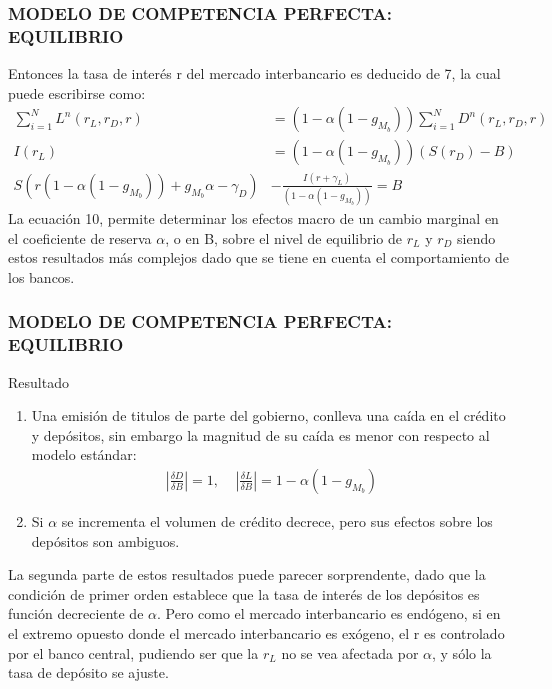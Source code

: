 \documentclass[10pt, xcolor=table, x11names]{beamer}
\begin{document}
\begin{frame}
    \frametitle{{\normalsize MODELO DE COMPETENCIA PERFECTA: EQUILIBRIO} {}}
    Entonces la tasa de interés r del mercado interbancario es deducido de 7, la cual puede escribirse como:
    \begin{align}
    \sum_{i=1}^{N}L^{n}(r_{L}, r_{D}, r)&=(1-\alpha(1-g_{M_{b}}))\sum_{i=1}^{N}D^{n}(r_{L}, r_{D}, r)  \nonumber \\
    I(r_{L})&=(1-\alpha(1-g_{M_{b}}))(S(r_{D})-B) \nonumber \\
    S(r(1-\alpha(1-g_{M_{b}}))+g_{M_{b}}\alpha-\gamma_{D})&-\frac{I(r+\gamma_{L})}{(1-\alpha(1-g_{M_{b}}))} =B
    \end{align} 
    La ecuación 10, permite determinar los efectos macro de un cambio marginal en el coeficiente de reserva $\alpha$, o en B, sobre el nivel de equilibrio de $r_{L}$ y $r_{D}$ siendo estos resultados más complejos dado que se tiene en cuenta el comportamiento de los bancos.
\end{frame}

\begin{frame}\frametitle{{\normalsize MODELO DE COMPETENCIA PERFECTA: EQUILIBRIO} {}}
    
    \begin{block} {Resultado}
        \begin{enumerate}
            \item Una emisión de titulos de parte del gobierno, conlleva una caída en el crédito y depósitos, sin embargo la magnitud de su caída es menor con respecto al modelo estándar:
            \begin{align}
            |\frac{\delta D}{\delta B}| =1,\;\;\;\; |\frac{\delta L}{\delta B}|=1-\alpha(1-g_{M_{b}}) \nonumber 
            \end{align} 
            \item Si $\alpha$ se incrementa el volumen de crédito decrece, pero sus efectos sobre los depósitos son ambiguos.
        \end{enumerate}    
   
    \end{block}	 
    
     La segunda parte de estos resultados puede parecer sorprendente, dado que la condición de primer orden establece que la tasa de interés de los depósitos es función decreciente de  $\alpha$. Pero como el mercado interbancario es endógeno, si en el extremo opuesto donde el mercado interbancario es exógeno, el r es controlado por el banco central, pudiendo ser que la $r_{L}$ no se vea afectada por $\alpha$, y sólo la tasa de depósito se ajuste.  
    
\end{frame}
\end{document}
